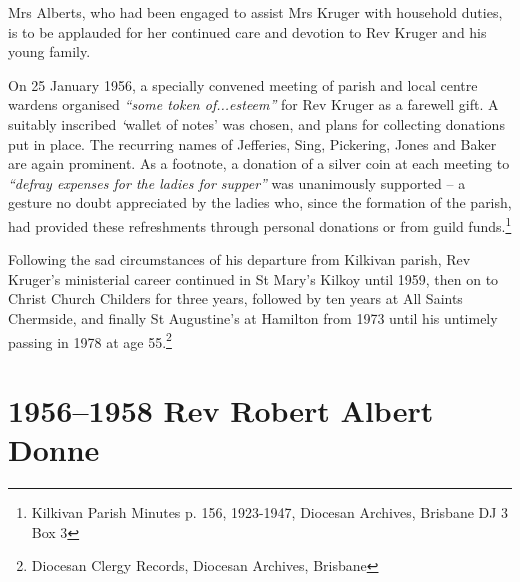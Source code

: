 Mrs Alberts, who had been engaged to assist Mrs Kruger with household duties, is to be applauded for her continued care and devotion to Rev Kruger and his young family.



\balance


On 25 January 1956, a specially convened meeting of parish and local centre wardens organised \emph{``some token of...esteem''} for Rev Kruger as a farewell gift. A suitably inscribed \emph{`}wallet of notes' was chosen, and plans for collecting donations put in place. The recurring names of Jefferies, Sing, Pickering, Jones and Baker are again prominent. As a footnote, a donation of a silver coin at each meeting to \emph{``defray expenses for the ladies for supper''} was unanimously supported -- a gesture no doubt appreciated by the ladies who, since the formation of the parish, had provided these refreshments through personal donations or from guild funds.\footnote{Kilkivan Parish Minutes p. 156, 1923-1947, Diocesan Archives, Brisbane DJ 3 Box 3}


Following the sad circumstances of his departure from Kilkivan parish, Rev Kruger's ministerial career continued in St Mary's Kilkoy until 1959, then on to Christ Church Childers for three years, followed by ten years at All Saints Chermside, and finally St Augustine's at Hamilton from 1973 until his untimely passing in 1978 at age 55.\footnote{Diocesan Clergy Records, Diocesan Archives, Brisbane}


\printendnotes[custom]
\setcounter{endnote}{0}




\chapter{1956--1958 Rev Robert Albert Donne}
\nobalance


